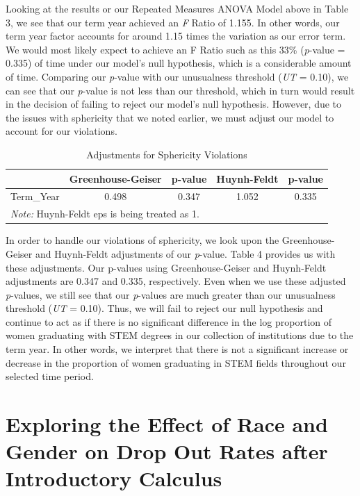 \documentclass[]{article}
\begin{document}
Looking at the results or our Repeated Measures ANOVA Model above in
Table 3, we see that our term year achieved an \emph{F} Ratio of 1.155.
In other words, our term year factor accounts for around 1.15 times the
variation as our error term. We would most likely expect to achieve an F
Ratio such as this 33\% (\emph{p}-value = 0.335) of time under our
model's null hypothesis, which is a considerable amount of time.
Comparing our \emph{p}-value with our unusualness threshold (\emph{UT} =
0.10), we can see that our \emph{p}-value is not less than our
threshold, which in turn would result in the decision of failing to
reject our model's null hypothesis. However, due to the issues with
sphericity that we noted earlier, we must adjust our model to account
for our violations.

\begin{table}[H]

\caption{\label{tab:sphericityAdjustments}Adjustments for Sphericity Violations}
\centering
\fontsize{12}{14}\selectfont
\begin{tabular}[t]{l|c|c|c|c}
\hline
  & Greenhouse-Geiser & p-value & Huynh-Feldt & p-value\\
\hline
Term\_Year & 0.498 & 0.347 & 1.052 & 0.335\\
\hline
\multicolumn{5}{l}{\textit{Note: } Huynh-Feldt eps is being treated as 1.}\\
\end{tabular}
\end{table}

In order to handle our violations of sphericity, we look upon the
Greenhouse-Geiser and Huynh-Feldt adjustments of our \emph{p}-value.
Table 4 provides us with these adjustments. Our p-values using
Greenhouse-Geiser and Huynh-Feldt adjustments are 0.347 and 0.335,
respectively. Even when we use these adjusted \emph{p}-values, we still
see that our \emph{p}-values are much greater than our unusualness
threshold (\emph{UT} = 0.10). Thus, we will fail to reject our null
hypothesis and continue to act as if there is no significant difference
in the log proportion of women graduating with STEM degrees in our
collection of institutions due to the term year. In other words, we
interpret that there is not a significant increase or decrease in the
proportion of women graduating in STEM fields throughout our selected
time period.

\section{Exploring the Effect of Race and Gender on Drop Out Rates after
Introductory
Calculus}\label{exploring-the-effect-of-race-and-gender-on-drop-out-rates-after-introductory-calculus}
\end{document}
